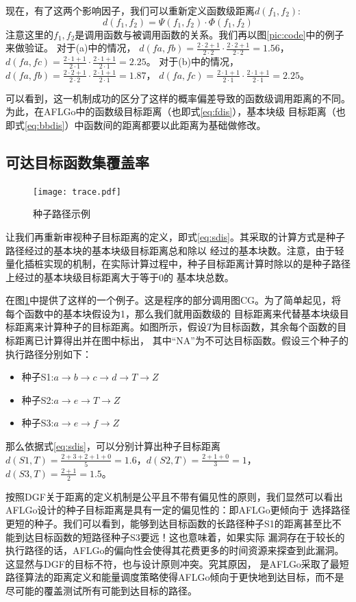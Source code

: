 \documentclass[bachelor]{njupthesis}
\begin{document}
现在，有了这两个影响因子，我们可以重新定义函数级距离$d(f_1,f_2)$:
\begin{equation}\label{eq:ffdis}
	d(f_1,f_2)=\Psi (f_1,f_2)\cdot \Phi (f_1,f_2) 
\end{equation}
注意这里的$f_1,f_2$是调用函数与被调用函数的关系。我们再以图\ref{pic:code}中的例子来做验证。
对于(a)中的情况，
$d(fa,fb)=\frac{2\cdot 2+1}{2\cdot 2} \cdot \frac{2\cdot 2+1}{2\cdot 2} = 1.56$，
$d(fa,fc)=\frac{2\cdot 1+1}{2\cdot 1} \cdot \frac{2\cdot 1+1}{2\cdot 1} = 2.25$。
对于(b)中的情况，
$d(fa,fb)=\frac{2\cdot 2+1}{2\cdot 2} \cdot \frac{2\cdot 1+1}{2\cdot 1} = 1.87$，
$d(fa,fc)=\frac{2\cdot 1+1}{2\cdot 1} \cdot \frac{2\cdot 1+1}{2\cdot 1} = 2.25$。

可以看到，这一机制成功的区分了这样的概率偏差导致的函数级调用距离的不同。为此，在AFLGo中的函数级目标距离（也即式\ref{eq:fdis}），基本块级
目标距离（也即式\ref{eq:bbdis}）中函数间的距离都要以此距离为基础做修改。

\subsection{可达目标函数集覆盖率}
\begin{figure}[htb]
	\centering
	\texttt{[image: trace.pdf]}
	\caption{种子路径示例}
 	\label{pic:trace}
\end{figure}

让我们再重新审视种子目标距离的定义，即式\ref{eq:sdis}。其采取的计算方式是种子路径经过的基本块的基本块级目标距离总和除以
经过的基本块数。注意，由于轻量化插桩实现的机制，在实际计算过程中，种子目标距离计算时除以的是种子路径上经过的基本块级目标距离大于等于0的
基本块总数。

在图\ref{pic:trace}中提供了这样的一个例子。这是程序的部分调用图CG。为了简单起见，将每个函数中的基本块假设为1，那么我们就用函数级的
目标距离来代替基本块级目标距离来计算种子的目标距离。如图所示，假设$T$为目标函数，其余每个函数的目标距离已计算得出并在图中标出，
其中“NA”为不可达目标函数。假设三个种子的执行路径分别如下：
\begin{itemize}
	\item 种子S1:$a \to b \to c \to d \to T \to Z$
	\item 种子S2:$a \to e \to T \to Z$
	\item 种子S3:$a \to e \to f \to Z$
\end{itemize}
那么依据式\ref{eq:sdis}，可以分别计算出种子目标距离$d(S1,T)=\frac{2+3+2+1+0}{5}=1.6$，$d(S2,T)=\frac{2+1+0}{3}=1$，
$d(S3,T)=\frac{2+1}{2}=1.5$。

按照DGF关于距离的定义机制是公平且不带有偏见性的原则，我们显然可以看出AFLGo设计的种子目标距离是具有一定的偏见性的：即AFLGo更倾向于
选择路径更短的种子。我们可以看到，能够到达目标函数的长路径种子S1的距离甚至比不能到达目标函数的短路径种子S3要远！这也意味着，如果实际
漏洞存在于较长的执行路径的话，AFLGo的偏向性会使得其花费更多的时间资源来探查到此漏洞。这显然与DGF的目标不符，也与设计原则冲突。究其原因，
是AFLGo采取了最短路径算法的距离定义和能量调度策略使得AFLGo倾向于更快地到达目标，而不是尽可能的覆盖测试所有可能到达目标的路径。
\end{document}
